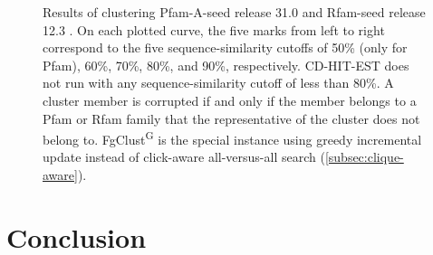 \documentclass{bioinfo}
\begin{document}
\begin{figure}
	\caption{Results of clustering Pfam-A-seed release 31.0 \citep{finn2016pfam} and Rfam-seed release 12.3 \citep{nawrocki2014rfam}.
		On each plotted curve, the five marks from left to right correspond to the five sequence-similarity cutoffs of 50\% (only for Pfam), 60\%, 70\%, 80\%, and 90\%, respectively.
		CD-HIT-EST does not run with any sequence-similarity cutoff of less than 80\%.
		A cluster member is corrupted if and only if the member belongs to a Pfam or Rfam family that the representative of the cluster does not belong to.
		FgClust\textsuperscript{G} is the special instance using greedy incremental update instead of click-aware all-versus-all search (\cref{subsec:clique-aware}).
		\label{fig:pfam}
		\label{fig:rfam}
	}
\end{figure}


%
%

\section{Conclusion}
\end{document}
